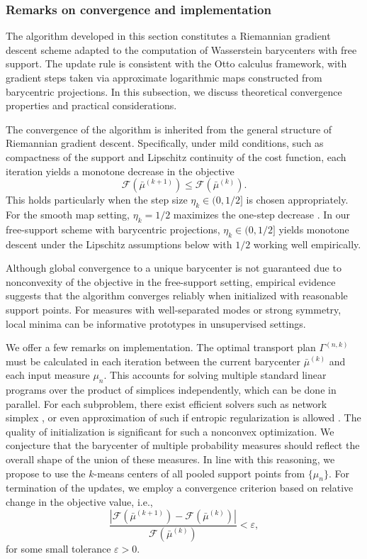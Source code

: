 \documentclass[11pt]{article}
\newcommand{\calF}{\mathcal{F}}
\begin{document}
\subsubsection{Remarks on convergence and implementation}

The algorithm developed in this section constitutes a Riemannian gradient descent scheme adapted to the computation of Wasserstein barycenters with free support. The update rule is consistent with the Otto calculus framework, with gradient steps taken via approximate logarithmic maps constructed from barycentric projections. In this subsection, we discuss theoretical convergence properties and practical considerations.

The convergence of the algorithm is inherited from the general structure of Riemannian gradient descent. Specifically, under mild conditions, such as compactness of the support and Lipschitz continuity of the cost function, each iteration yields a monotone decrease in the objective
\begin{equation*}
    \calF(\bar{\mu}^{(k+1)})\leq \calF(\bar{\mu}^{(k)}).
\end{equation*}
This holds particularly when the step size $\eta_k \in (0,1/2]$ is chosen appropriately. For the smooth map setting, $\eta_k = 1/2$ maximizes the one-step decrease \citep{zemel_2019_FrechetMeansProcrustes}. In our free-support scheme with barycentric projections, $\eta_k \in (0, 1/2]$ yields monotone descent under the Lipschitz assumptions below with $1/2$ working well empirically.

Although global convergence to a unique barycenter is not guaranteed due to nonconvexity of the objective in the free-support setting, empirical evidence suggests that the algorithm converges reliably when initialized with reasonable support points. For measures with well-separated modes or strong symmetry, local minima can be informative prototypes in unsupervised settings.

We offer a few remarks on implementation. The optimal transport plan $\Gamma^{(n,k)}$ must be calculated in each iteration between the current barycenter $\bar{\mu}^{(k)}$ and each input measure $\mu_n$. This accounts for solving multiple standard linear programs over the product of simplices independently, which can be done in parallel. For each subproblem, there exist efficient solvers such as network simplex \citep{bazaraa_2010_LinearProgrammingNetwork}, or even approximation of such if entropic regularization is allowed \citep{cuturi_2013_SinkhornDistancesLightspeed}. The quality of initialization is significant for such a nonconvex optimization. We conjecture that the barycenter of multiple probability measures should reflect the overall shape of the union of these measures. In line with this reasoning, we propose to use the $k$-means centers of all pooled support points from $\lbrace \mu_n \rbrace$. For termination of the updates, we employ a convergence criterion based on relative change in the objective value, i.e., 
\begin{equation*}
    \frac{|\calF(\bar{\mu}^{(k+1)})-\calF(\bar{\mu}^{(k)})|}{\calF(\bar{\mu}^{(k)})} < \varepsilon,
\end{equation*}
for some small tolerance $\varepsilon > 0$. 
\end{document}
